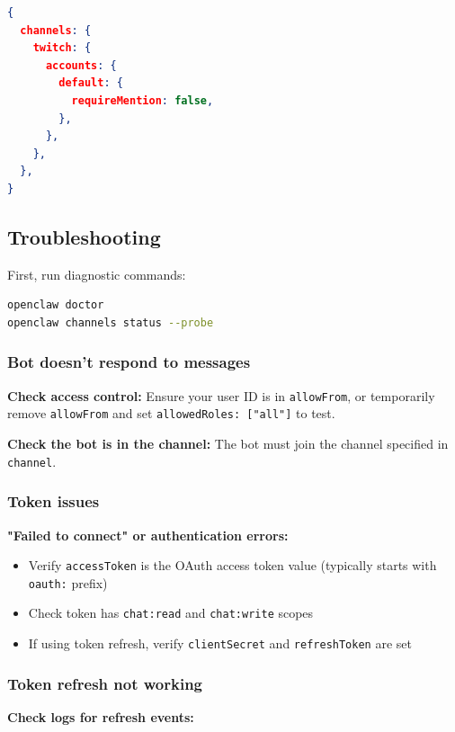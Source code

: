 \begin{lstlisting}[language=json]
{
  channels: {
    twitch: {
      accounts: {
        default: {
          requireMention: false,
        },
      },
    },
  },
}
\end{lstlisting}


\subsection{Troubleshooting}


First, run diagnostic commands:

\begin{lstlisting}[language=bash]
openclaw doctor
openclaw channels status --probe
\end{lstlisting}


\subsubsection{Bot doesn't respond to messages}


\textbf{Check access control:} Ensure your user ID is in \texttt{allowFrom}, or temporarily remove
\texttt{allowFrom} and set \texttt{allowedRoles: ["all"]} to test.

\textbf{Check the bot is in the channel:} The bot must join the channel specified in \texttt{channel}.

\subsubsection{Token issues}


\textbf{"Failed to connect" or authentication errors:}

\begin{itemize}
  \item Verify \texttt{accessToken} is the OAuth access token value (typically starts with \texttt{oauth:} prefix)
  \item Check token has \texttt{chat:read} and \texttt{chat:write} scopes
  \item If using token refresh, verify \texttt{clientSecret} and \texttt{refreshToken} are set
\end{itemize}


\subsubsection{Token refresh not working}


\textbf{Check logs for refresh events:}


